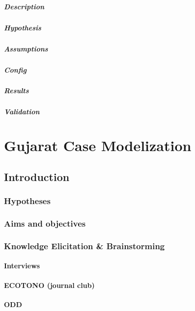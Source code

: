 \documentclass{report}
\begin{document}
			\paragraph{Description}
			\paragraph{Hypothesis}
			\paragraph{Assumptions}
			\paragraph{Config}
			\paragraph{Results}
			\paragraph{Validation}
	
\newpage 
\chapter{Gujarat Case Modelization}
	\section{Introduction}
	    \subsection{Hypotheses}
	    \subsection{Aims and objectives}
	    \subsection{Knowledge Elicitation \& Brainstorming}
		\subsubsection{Interviews}
		\subsubsection{ECOTONO (journal club)}	
		\subsubsection{ODD}
\end{document}
